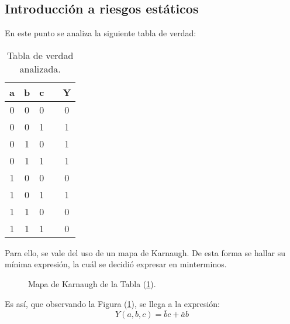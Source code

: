 



\subsection{Introducción a riesgos estáticos}
En este punto se analiza la siguiente tabla de verdad:
\begin{table}[H]
\centering
\begin{tabular}{ccccc}
\hline
\textbf{a} & \textbf{b} & \textbf{c} &  & \textbf{Y} \\
\hline
0          & 0          & 0          &  & 0         \\
0          & 0          & 1          &  & 1         \\
0          & 1          & 0          &  & 1         \\
0          & 1          & 1          &  & 1         \\
1          & 0          & 0          &  & 0         \\
1          & 0          & 1          &  & 1         \\
1          & 1          & 0          &  & 0         \\
1          & 1          & 1          &  & 0         \\
\hline
\end{tabular}
\caption{Tabla de verdad analizada.}
\label{tabla:verdad}
\end{table}

Para ello, se vale del uso de un mapa de Karnaugh. De esta forma se hallar su mínima expresión, la cuál se decidió expresar en minterminos.

\begin{figure}[H]
\begin{centering}
    \begin{Karnaughvuit}
        
    \end{Karnaughvuit}
\par\end{centering}
\centering
\caption{Mapa de Karnaugh de la Tabla (\ref{tabla:verdad}).}
\label{fig:karsinc}
\end{figure}

Es así, que observando la Figura (\ref{fig:karsinc}), se llega a la expresión:
\begin{equation}
	Y \left( a,b,c \right) = \bar{b} c + \bar{a} b
	\label{equ:karsinc}
\end{equation}

